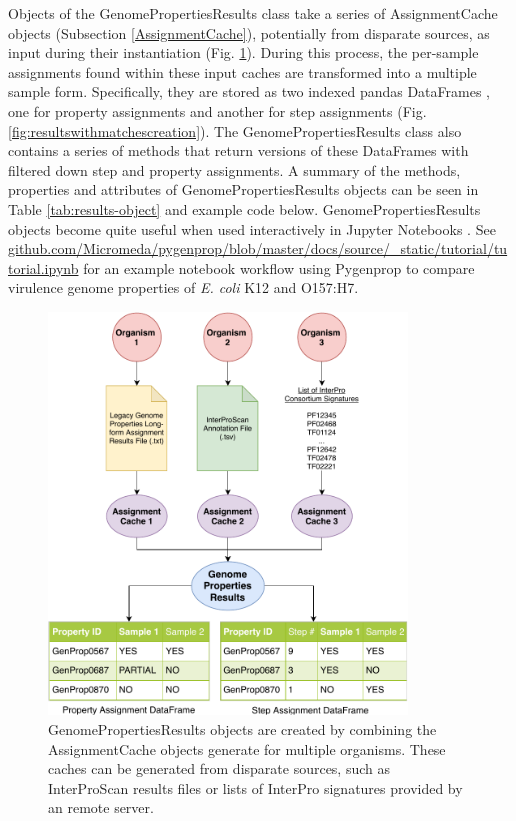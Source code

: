 Objects of the GenomePropertiesResults class take a series of AssignmentCache objects (Subsection \ref{AssignmentCache}), potentially from disparate sources, as input during their instantiation (Fig. \ref{fig:resultscreation}). During this process, the per-sample assignments found within these input caches are transformed into a multiple sample form. Specifically, they are stored as two indexed pandas DataFrames \cite{mckinney2010data}, one for property assignments and another for step assignments (Fig. \ref{fig:resultswithmatchescreation}). The GenomePropertiesResults class also contains a series of methods that return versions of these DataFrames with filtered down step and property assignments. A summary of the methods, properties and attributes of GenomePropertiesResults objects can be seen in Table \ref{tab:results-object} and example code below. GenomePropertiesResults objects become quite useful when used interactively in Jupyter Notebooks \cite{kluyver2016jupyter}. See \href{github.com/Micromeda/pygenprop/blob/master/docs/source/\_static/tutorial/tutorial.ipynb}{github.com/Micromeda/pygenprop/blob/master/docs/source/\_static/tutorial/tutorial.ipynb} for an example notebook workflow using Pygenprop to compare virulence genome properties of \textit{E. coli} K12 and O157:H7.

\begin{figure}[!ht]
  \centering
	\includegraphics[width=0.85\textwidth]{media/assignment_results_overview.pdf}
	 \caption{GenomePropertiesResults objects are created by combining the AssignmentCache objects generate for multiple organisms. These caches can be generated from disparate sources, such as InterProScan results files or lists of InterPro signatures provided by an remote server.}
	 \label{fig:resultscreation}
\end{figure}

